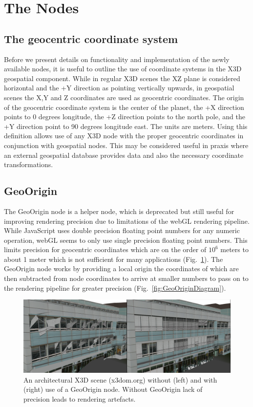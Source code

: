 \documentclass{acmsiggraph}                     %
\begin{document}
\section{The Nodes}

\subsection{The geocentric coordinate system}

Before we present details on functionality and implementation of the newly available nodes, it is
useful to outline the use of coordinate systems in the X3D geospatial component. While in regular
X3D scenes the XZ plane is considered horizontal and the +Y direction as pointing vertically
upwards, in geospatial scenes the X,Y and Z coordinates are used as geocentric coordinates. The
origin of the geocentric coordinate system is the center of the planet, the +X direction points to 0
degrees longitude, the +Z direction points to the north pole, and the +Y direction point to 90
degrees longitude east. The units are meters. Using this definition allows use of any X3D node with
the proper geocentric coordinates in conjunction with geospatial nodes. This may be considered
useful in praxis where an external geospatial database provides data and also the necessary
coordinate transformations.

\subsection{GeoOrigin}

The GeoOrigin node is a helper node, which is deprecated but still useful for improving rendering
precision due to limitations of the webGL rendering pipeline. While JavaScript uses double precision
floating point numbers for any numeric operation, webGL seems to only use single precision floating
point numbers. This limits precision for geocentric coordinates which are on the order of $10^{6}$
meters to about 1 meter which is not sufficient for many applications
(Fig.~\ref{fig:GeoOriginImage}). The GeoOrigin node works by providing a local origin the
coordinates of which are then subtracted from node coordinates to arrive at smaller numbers to pass
on to the rendering pipeline for greater precision (Fig.~\ref{fig:GeoOriginDiagram}).

\begin{figure}[htbp] \centering \includegraphics[width=6.6in]{GeoOriginImage.png} \caption{An
  architectural X3D scene (x3dom.org) without (left) and with (right) use of a GeoOrigin node.
Without GeoOrigin lack of precision leads to rendering artefacts.} \label{fig:GeoOriginImage}
\end{figure}
\end{document}
